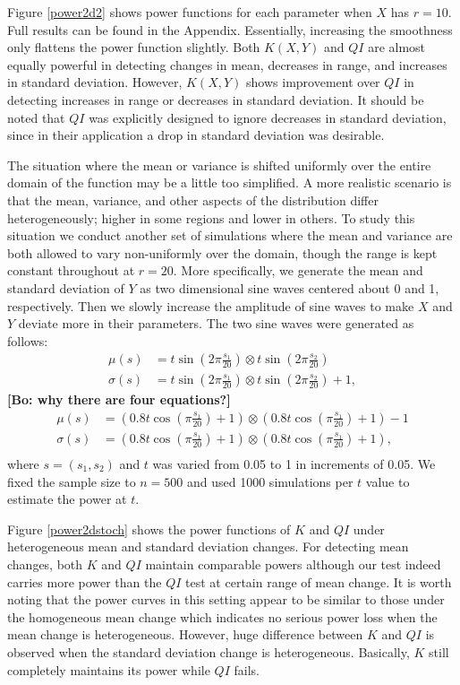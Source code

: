 \documentclass[12pt]{article}
\newcommand{\bl}[1]{\color{Red}\textbf{[Bo: #1]}\normalcolor}
\begin{document}
Figure \ref{power2d2} shows power functions for each parameter when $X$ has $r = 10$. Full results can be found in the Appendix.  Essentially, increasing the smoothness only flattens the power function slightly. Both $K(X, Y)$ and $QI$ are almost equally powerful in detecting changes in mean, decreases in range, and increases in standard deviation. However, $K(X, Y)$ shows improvement over $QI$ in detecting increases in range or decreases in standard deviation. It should be noted that $QI$ was explicitly designed to ignore decreases in standard deviation, since in their application a drop in standard deviation was desirable.

The situation where the mean or variance is shifted uniformly over the entire domain of the function may be a little too simplified. A more realistic scenario is that the mean, variance, and other aspects of the distribution differ heterogeneously; higher in some regions and lower in others. To study this situation we conduct another set of simulations where the mean and variance are both allowed to vary non-uniformly over the domain, though the range is kept constant throughout at $r = 20$. More specifically, we  generate the mean and standard deviation of $Y$ as two dimensional sine waves centered about 0 and 1, respectively.  Then we slowly increase the amplitude of sine waves to make $X$ and $Y$ deviate more in their parameters. The two sine waves were generated as follows:
\begin{align*}
    \mu(s) &= t \sin \left( 2 \pi \frac{s_1}{20} \right) \otimes t \sin \left( 2 \pi \frac{s_2}{20} \right)\\
    \sigma(s) &=  t \sin \left(2 \pi \frac{s_1}{20} \right) \otimes t \sin \left(2 \pi \frac{s_2}{20} \right) + 1,
\end{align*}
\bl{why there are four equations?}
\begin{align*}
    \mu(s) &= \left(0.8 t \cos \left(\pi \frac{s_1}{20} \right) + 1 \right) \otimes \left(0.8 t \cos \left(\pi \frac{s_1}{20} \right) + 1 \right) - 1 \\
    \sigma(s) &=  \left(0.8 t \cos \left(\pi \frac{s_1}{20} \right) + 1 \right) \otimes \left(0.8 t \cos \left(\pi \frac{s_1}{20} \right) + 1 \right), \\
\end{align*}
where $s = (s_1, s_2)$ and $t$ was varied from 0.05 to 1 in increments of 0.05. We fixed the sample size to $n = 500$ and used 1000 simulations per $t$ value to estimate the power at $t$.

Figure \ref{power2dstoch} shows the power functions of $K$ and $QI$ under heterogeneous mean and standard deviation changes. For detecting mean changes, both $K$ and $QI$ maintain comparable powers although our test indeed carries more power than the $QI$ test at certain range of mean change. It is worth noting that the power curves in this setting appear to be similar to those under the homogeneous mean change which indicates no serious power loss when the mean change is heterogeneous. However, huge difference between $K$ and $QI$ is observed when the standard deviation change is heterogeneous. Basically, $K$ still completely maintains its power while $QI$ fails. 
\end{document}
